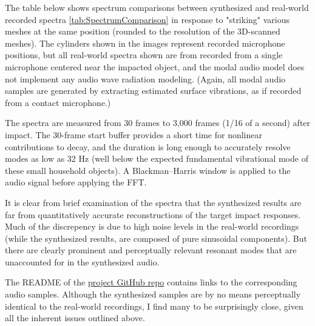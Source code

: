 \documentclass[12pt]{article}
\begin{document}
The table below shows spectrum comparisons between synthesized and real-world recorded spectra \ref{tab:SpectrumComparison} in response to "striking" various meshes at the same position (rounded to the resolution of the 3D-scanned meshes).
The cylinders shown in the images represent recorded microphone positions, but all real-world spectra shown are from recorded from a single microphone centered near the impacted object, and the modal audio model does not implement any audio wave radiation modeling.
(Again, all modal audio samples are generated by extracting estimated surface vibrations, as if recorded from a contact microphone.)

The spectra are measured from 30 frames to 3,000 frames (1/16 of a second) after impact.
The 30-frame start buffer provides a short time for nonlinear contributions to decay, and the duration is long enough to accurately resolve modes as low as 32 Hz (well below the expected fundamental vibrational mode of these small household objects).
A Blackman–Harris window is applied to the audio signal before applying the FFT.

It is clear from brief examination of the spectra that the synthesized results are far from quantitatively accurate reconstructions of the target impact responses.
Much of the discrepency is due to high noise levels in the real-world recordings (while the synthesized results, are composed of pure sinusoidal components).
But there are clearly prominent and perceptually relevant resonant modes that are unaccounted for in the synthesized audio.

The README of the \href{https://github.com/khiner/MeshEditor}{project GitHub repo} contains links to the corresponding audio samples.
Although the synthesized samples are by no means perceptually identical to the real-world recordings, I find many to be surprisingly close, given all the inherent issues outlined above.
\end{document}

